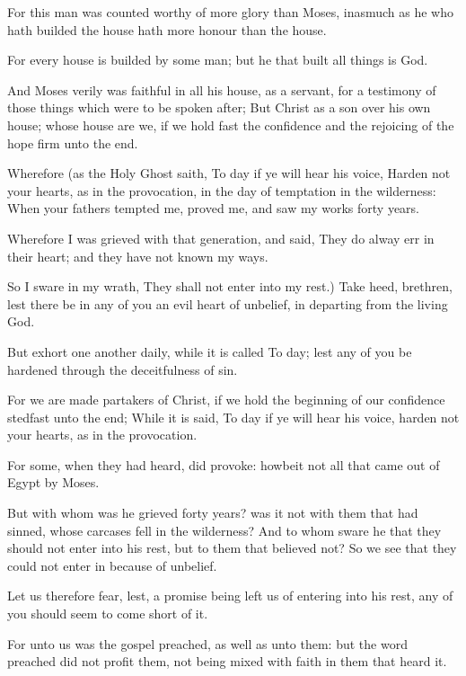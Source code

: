 \Verse For this man was counted worthy of more glory than Moses, inasmuch as he who hath builded the house hath more honour than the house.

\Verse For every house is builded by some man; but he that built all things is God.

\Verse And Moses verily was faithful in all his house, as a servant, for a testimony of those things which were to be spoken after; \Verse But Christ as a son over his own house; whose house are we, if we hold fast the confidence and the rejoicing of the hope firm unto the end.

\Verse Wherefore (as the Holy Ghost saith, To day if ye will hear his voice, \Verse Harden not your hearts, as in the provocation, in the day of temptation in the wilderness: \Verse When your fathers tempted me, proved me, and saw my works forty years.

\Verse Wherefore I was grieved with that generation, and said, They do alway err in their heart; and they have not known my ways.

\Verse So I sware in my wrath, They shall not enter into my rest.)  \Verse Take heed, brethren, lest there be in any of you an evil heart of unbelief, in departing from the living God.

\Verse But exhort one another daily, while it is called To day; lest any of you be hardened through the deceitfulness of sin.

\Verse For we are made partakers of Christ, if we hold the beginning of our confidence stedfast unto the end; \Verse While it is said, To day if ye will hear his voice, harden not your hearts, as in the provocation.

\Verse For some, when they had heard, did provoke: howbeit not all that came out of Egypt by Moses.

\Verse But with whom was he grieved forty years? was it not with them that had sinned, whose carcases fell in the wilderness?  \Verse And to whom sware he that they should not enter into his rest, but to them that believed not?  \Verse So we see that they could not enter in because of unbelief.


\Chapter
\Verse Let us therefore fear, lest, a promise being left us of entering into his rest, any of you should seem to come short of it.

\Verse For unto us was the gospel preached, as well as unto them: but the word preached did not profit them, not being mixed with faith in them that heard it.

